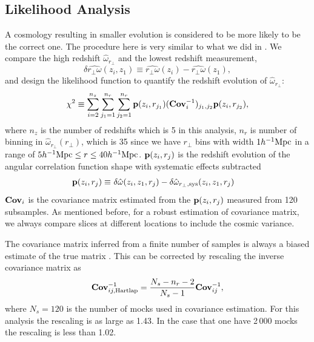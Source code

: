 \documentclass[iop]{emulateapj}
\begin{document}
\subsection{Likelihood Analysis}


A cosmology resulting in smaller evolution is considered to be more likely to be the correct one.
The procedure here is very similar to what we did in \cite{Li2014,Li2015,Li2016}.
We compare the high redshift $\hat\omega_{r_\perp}$ and the lowest redshift measurement,
\begin{equation}
 \delta \hat{r_\perp\omega}(z_i,z_1) \equiv \hat{r_\perp\omega}(z_i) - \hat{r_\perp\omega}(z_1),
\end{equation}
and design the likelihood function to quantify
the redshift evolution of $\hat\omega_{r_\perp}$:
\begin{equation}\label{eq:chisq1}
\chi^2\equiv \sum_{i=2}^{n_{z}} \sum_{j_1=1}^{n_{r}} \sum_{j_2=1}^{n_{r}} {\bf p}(z_i,r_{j_1}) ({\bf Cov}_{i}^{-1})_{j_1,j_2}  {\bf p}(z_i,r_{j_2}),
\end{equation}
where $n_z$ is the number of redshifts which is 5 in this analysis, 
$n_r$ is number of binning in $\hat{\omega}_{r_\perp}(r_\perp)$,
which is 35 since we have $r_\perp$ bins 
with width $1h^{-1}\rm Mpc$ in a range of $5h^{-1}{\rm Mpc}\leq r\leq 40h^{-1}{\rm Mpc}$.
${\bf p}(z_i,r_{j})$ is the redshift evolution of the angular correlation function shape with systematic effects subtracted
\begin{eqnarray}\label{eq:bfp}
 {\bf p}(z_i,r_{j}) \equiv&\ \delta \hat{\omega}(z_i,z_1,r_j) - \delta \hat{\omega}_{r_\perp,\rm sys}(z_i,z_1,r_j)
\end{eqnarray}
${\bf Cov}_i$ is the covariance matrix estimated from the ${\bf p}(z_i,r_{j})$ measured from 120 subsamples.
As mentioned before, for a robust estimation of covariance matrix, 
we always compare slices at different locations to 
include the cosmic variance.

The covariance matrix inferred from a finite number of samples
is always a biased estimate of the true matrix \citep{Hartlap}.
This can be corrected by rescaling the inverse covariance matrix as 
\begin{equation}
 {\bf Cov}^{-1}_{ij,\rm Hartlap} = \frac{N_s - n_{r}-2}{N_s-1} {\bf Cov}^{-1}_{ij},
\end{equation}
where $N_s=120$ is the number of mocks used in covariance estimation.
For this analysis the rescaling is as large as 1.43.
In the case that one have 2\,000 mocks the rescaling is less than 1.02.
\end{document}

